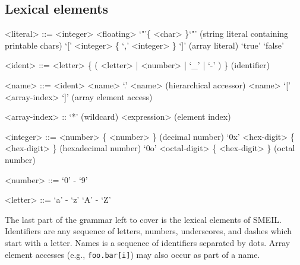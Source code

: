 \subsection{Lexical elements}
\begin{grammar}


  <literal> ::= <integer>
  \alt <floating>
  \alt `"'\{ <char> \}`"' (string literal containing printable chars)
  \alt `[' <integer> \{ `,' <integer> \} `]' (array literal)  
  \alt `true'
  \alt `false'

  <ident> ::= <letter> \{ ( <letter> | <number> | `_' | `-' ) \} (identifier)

  <name> ::= <ident>
  \alt <name> `.' <name> (hierarchical accessor)
  \alt <name> `[' <array-index> `]' (array element access)

  <array-index> :: `*' (wildcard)
  \alt <expression> (element index)

  <integer> ::= <number> \{ <number> \} (decimal number)
  \alt `0x' <hex-digit> \{ <hex-digit> \} (hexadecimal number)
  \alt `0o' <octal-digit> \{ <hex-digit> \} (octal number)

  <number> ::= `0' - `9'

  <letter> ::= `a' - `z' `A' - `Z'
  
\end{grammar}

The last part of the grammar left to cover is the lexical elements of
SMEIL. Identifiers are any sequence of letters, numbers, underscores, and dashes
which start with a letter. Names is a sequence of identifiers separated by
dots. Array element accesses (e.g., {\tt foo.bar[i]}) may also occur as part of
a name.

